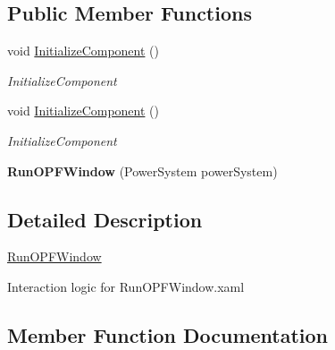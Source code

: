 \subsection*{Public Member Functions}
\begin{DoxyCompactItemize}
\item 
void \hyperlink{class_power_system_planning_wpf_app_1_1_o_p_f_1_1_run_o_p_f_window_a91ab91e324339cf90a9f3265e2b3e636}{Initialize\+Component} ()
\begin{DoxyCompactList}\small\item\em Initialize\+Component \end{DoxyCompactList}\item 
void \hyperlink{class_power_system_planning_wpf_app_1_1_o_p_f_1_1_run_o_p_f_window_a91ab91e324339cf90a9f3265e2b3e636}{Initialize\+Component} ()
\begin{DoxyCompactList}\small\item\em Initialize\+Component \end{DoxyCompactList}\item 
{\bfseries Run\+O\+P\+F\+Window} (Power\+System power\+System)\hypertarget{class_power_system_planning_wpf_app_1_1_o_p_f_1_1_run_o_p_f_window_afc3cbde00426a5913ef9996a89a553e4}{}\label{class_power_system_planning_wpf_app_1_1_o_p_f_1_1_run_o_p_f_window_afc3cbde00426a5913ef9996a89a553e4}

\end{DoxyCompactItemize}


\subsection{Detailed Description}
\hyperlink{class_power_system_planning_wpf_app_1_1_o_p_f_1_1_run_o_p_f_window}{Run\+O\+P\+F\+Window} 

Interaction logic for Run\+O\+P\+F\+Window.\+xaml 

\subsection{Member Function Documentation}
